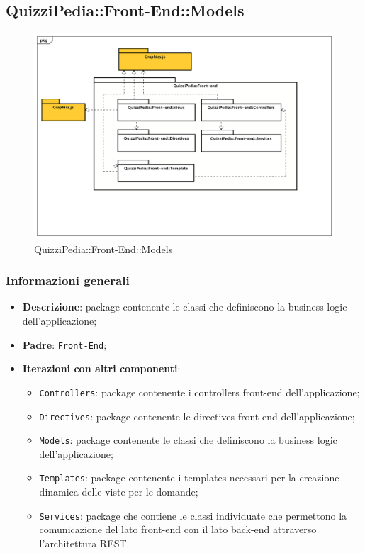 \newpage

\subsection{QuizziPedia::Front-End::Models}

	\label{QuizziPedia::Front-End::Models}
	
	\begin{figure}[h]
		\centering
		\includegraphics[scale=0.5,keepaspectratio]{UML/Package/QuizziPedia_Front-end.png}
		\caption{QuizziPedia::Front-End::Models}
	\end{figure}

	\subsubsection{Informazioni generali}
		\begin{itemize}
			\item \textbf{Descrizione}: package contenente le classi che definiscono la business logic dell'applicazione;
			\item \textbf{Padre}: \texttt{Front-End};
			\item \textbf{Iterazioni con altri componenti}: 
				\begin{itemize}				
					\item \texttt{Controllers}: package contenente i controllers front-end dell'applicazione;
					\item \texttt{Directives}: package contenente le directives front-end dell'applicazione;
					\item \texttt{Models}: package contenente le classi che definiscono la business logic dell'applicazione;
					\item \texttt{Templates}: package contenente i templates necessari per la creazione dinamica delle viste per le domande;
					\item \texttt{Services}: package che contiene le classi individuate che permettono la comunicazione del lato front-end con il lato back-end attraverso l'architettura REST.
				\end{itemize}

		\end{itemize}
	
